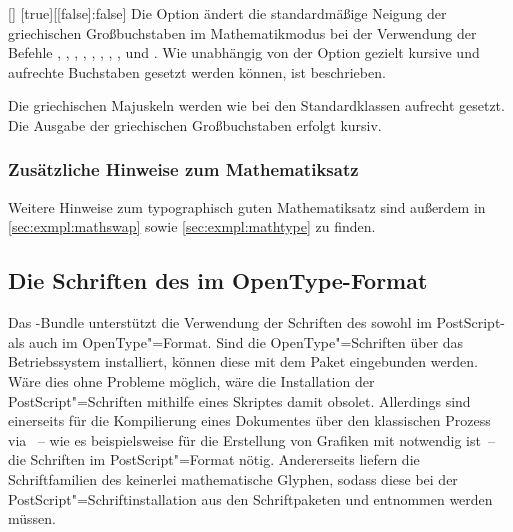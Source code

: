 \begin{Declaration}{[\PBoolean]}%
  [true][[false]:false]
\printdeclarationlist%
%
%
%
Die Option ändert die standardmäßige Neigung der griechischen Großbuchstaben im 
Mathematikmodus bei der Verwendung der Befehle , , 
, , , , , 
,  und . Wie unabhängig von der Option 
 gezielt kursive und aufrechte Buchstaben gesetzt werden 
können, ist  beschrieben.
%
\begin{values}
\itemfalse
  Die griechischen Majuskeln werden wie bei den Standardklassen aufrecht 
  gesetzt.
\itemtrue*
  Die Ausgabe der griechischen Großbuchstaben erfolgt kursiv.
\end{values}
\end{Declaration}

\subsubsection{Zusätzliche Hinweise zum Mathematiksatz}
Weitere Hinweise zum typographisch guten Mathematiksatz sind außerdem in 
\autoref{sec:exmpl:mathswap} sowie \autoref{sec:exmpl:mathtype} zu finden.


\subsection{Die Schriften des \CDs im OpenType-Format}
\label{sec:fonts:fontspec}
%
Das \TUDScript-Bundle unterstützt die Verwendung der Schriften des \CDs sowohl 
im PostScript- als auch im OpenType"=Format. Sind die OpenType"=Schriften über 
das Betriebssystem installiert, können diese mit dem Paket  
eingebunden werden. Wäre dies ohne Probleme möglich, wäre die Installation der 
PostScript"=Schriften mithilfe eines Skriptes damit obsolet. Allerdings sind 
einerseits für die Kompilierung eines Dokumentes über den klassischen Prozess 
via ~-- wie es 
beispielsweise für die Erstellung von Grafiken mit  notwendig 
ist~-- die Schriften im PostScript"=Format nötig. Andererseits liefern die 
Schriftfamilien des \CDs keinerlei mathematische Glyphen, sodass diese bei der 
PostScript"=Schriftinstallation aus den Schriftpaketen  und 
 entnommen werden müssen.

